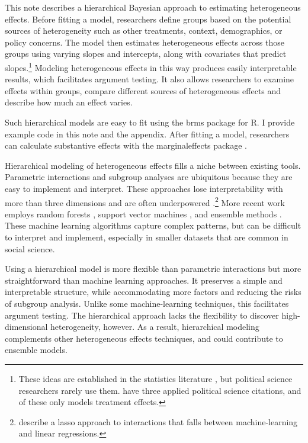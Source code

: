 \documentclass[12pt]{article}
\begin{document}
This note describes a hierarchical Bayesian approach to estimating heterogeneous effects. 
Before fitting a model, researchers define groups based on the potential sources of heterogeneity such as other treatments, context, demographics, or policy concerns. 
The model then estimates heterogeneous effects across those groups using varying slopes and intercepts, along with covariates that predict slopes.\footnote{These ideas are established in the statistics literature \citep{FellerGelman2015}, but political science researchers rarely use them. \citet{FellerGelman2015} have three applied political science citations, and of these only \citet{Marquardt2022} models treatment effects.} 
Modeling heterogeneous effects in this way produces easily interpretable results, which facilitates argument testing.
It also allows researchers to examine effects within groups, compare different sources of heterogeneous effects and describe how much an effect varies.  


Such hierarchical models are easy to fit using the brms package for \textsf{R}. 
I provide example code in this note and the appendix.
After fitting a model, researchers can calculate substantive effects with the marginaleffects package \citep{ArelBundockme}.


Hierarchical modeling of heterogeneous effects fills a niche between existing tools.
Parametric interactions and subgroup analyses are ubiquitous because they are easy to implement and interpret.
These approaches lose interpretability with more than three dimensions and are often underpowered \citep{Simmonsetal2011}.\footnote{\citet{BlackwellOlson2022} describe a lasso approach to interactions that falls between machine-learning and linear regressions.}
More recent work employs random forests \citep{GreenKern2012, WagerAthey2018}, support vector machines \citep{ImaiRatkovic2013}, and ensemble methods \citep{Grimmeretal2017, Kuenzeletal2019, Dorieetal2022}.
These machine learning algorithms capture complex patterns, but can be difficult to interpret and implement, especially in smaller datasets that are common in social science. 

 
Using a hierarchical model is more flexible than parametric interactions but more straightforward than machine learning approaches.  
It preserves a simple and interpretable structure, while accommodating more factors and reducing the risks of subgroup analysis. 
Unlike some machine-learning techniques, this facilitates argument testing.
The hierarchical approach lacks the flexibility to discover high-dimensional heterogeneity, however.  
As a result, hierarchical modeling complements other heterogeneous effects techniques, and could contribute to ensemble models. 
\end{document}
